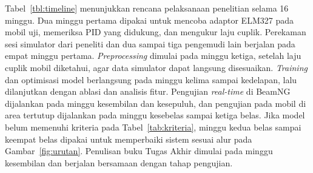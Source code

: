 Tabel~\ref{tbl:timeline} menunjukkan rencana pelaksanaan penelitian selama 16 minggu. Dua minggu pertama dipakai untuk mencoba adaptor ELM327 pada mobil uji, memeriksa PID yang didukung, dan mengukur laju cuplik. Perekaman sesi simulator dari peneliti dan dua sampai tiga pengemudi lain berjalan pada empat minggu pertama. \textit{Preprocessing} dimulai pada minggu ketiga, setelah laju cuplik mobil diketahui, agar data simulator dapat langsung disesuaikan. \textit{Training} dan optimisasi model berlangsung pada minggu kelima sampai kedelapan, lalu dilanjutkan dengan ablasi dan analisis fitur. Pengujian \textit{real-time} di BeamNG dijalankan pada minggu kesembilan dan kesepuluh, dan pengujian pada mobil di area tertutup dijalankan pada minggu kesebelas sampai ketiga belas. Jika model belum memenuhi kriteria pada Tabel~\ref{tab:kriteria}, minggu kedua belas sampai keempat belas dipakai untuk memperbaiki sistem sesuai alur pada Gambar~\ref{fig:urutan}. Penulisan buku Tugas Akhir dimulai pada minggu kesembilan dan berjalan bersamaan dengan tahap pengujian.
